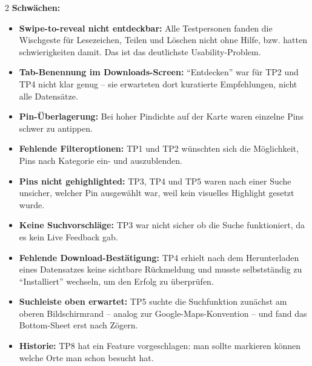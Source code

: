 \begin{multicols}{2}
\textbf{Schwächen:}
\begin{itemize}
  \item \textbf{Swipe-to-reveal nicht entdeckbar:} Alle Testpersonen fanden die Wischgeste für Lesezeichen, Teilen und Löschen
        nicht ohne Hilfe, bzw. hatten schwierigkeiten damit. Das ist das deutlichste Usability-Problem.
  \item \textbf{Tab-Benennung im Downloads-Screen:} \enquote{Entdecken}
        war für TP2 und TP4 nicht klar genug – sie erwarteten dort kuratierte
        Empfehlungen, nicht alle Datensätze.
  \item \textbf{Pin-Überlagerung:} Bei hoher Pindichte auf der Karte
        waren einzelne Pins schwer zu antippen.
  \item \textbf{Fehlende Filteroptionen:} TP1 und TP2 wünschten
        sich die Möglichkeit, Pins nach Kategorie ein- und auszublenden.
  \item \textbf{Pins nicht gehighlighted:} TP3, TP4 und TP5 waren
        nach einer Suche unsicher, welcher Pin ausgewählt war, weil kein
        visuelles Highlight gesetzt wurde.
  \item \textbf{Keine Suchvorschläge:} TP3 war nicht sicher ob die Suche funktioniert, da es kein Live Feedback gab.
  \item \textbf{Fehlende Download-Bestätigung:} TP4 erhielt
        nach dem Herunterladen eines Datensatzes keine sichtbare Rückmeldung
        und musste selbstständig zu \enquote{Installiert} wechseln, um den
        Erfolg zu überprüfen.
  \item \textbf{Suchleiste oben erwartet:} TP5 suchte die Suchfunktion
        zunächst am oberen Bildschirmrand – analog zur Google-Maps-Konvention –
        und fand das Bottom-Sheet erst nach Zögern.
      \item \textbf{Historie:} TP8 hat ein Feature vorgeschlagen: man sollte markieren können welche Orte man schon besucht hat.
\end{itemize}

\end{multicols}